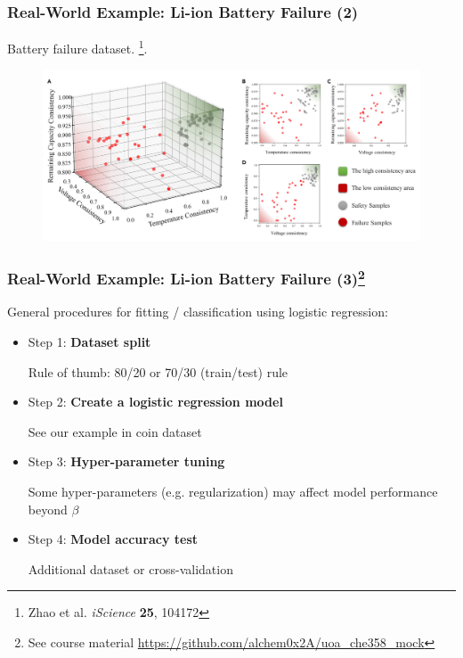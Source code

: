 \documentclass[10pt,aspectratio=169]{beamer}
\begin{document}
      \begin{frame}
        \frametitle{Real-World Example: Li-ion Battery Failure (2)}
        Battery failure
        dataset. \let\thefootnote\relax\footnote{{\scriptsize Zhao et
            al. \textit{iScience} \textbf{25}, 104172}}.

        \begin{figure}[t]
          \includegraphics[width=1.0\linewidth]{images/battery_2.png}
        \end{figure}
      \end{frame}

      \begin{frame}
        \frametitle{Real-World Example: Li-ion Battery Failure
          (3)\let\thefootnote\relax\footnote{{\scriptsize See course
              material
              \url{https://github.com/alchem0x2A/uoa_che358_mock}}}}
        
        General procedures for fitting / classification using logistic regression:
        
        \begin{itemize}
        \vfill \item Step 1: \textbf{Dataset split} 

          Rule of thumb: 80/20 or 70/30 (train/test) rule
          
        \vfill \item Step 2:\textbf{ Create a logistic regression model}

          See our example in coin dataset
          
        \vfill \item Step 3: \textbf{Hyper-parameter tuning}

          Some hyper-parameters (e.g. regularization) may affect model
          performance beyond $\beta$
          
        \vfill \item Step 4: \textbf{Model accuracy test}

          Additional dataset or cross-validation
        \end{itemize}
        
        
      \end{frame}
\end{document}
